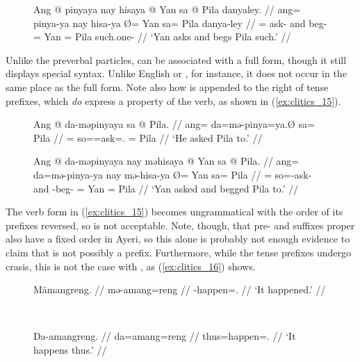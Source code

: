 \begin{figure}
\ex\label{ex:clitics_14}\begingl
	\gla Ang @ pinyaya nay hisaya {} @ Yan sa @ Pila danyaley. //
	\glb ang= pinya-ya nay hisa-ya Ø= Yan sa= Pila danya-ley //
	\glc \AgtT{}= ask-\TsgM{} and beg-\TsgM{} \Top{}= Yan \Parg{}= Pila
		such.one-\PargI{} //
	\glft `Yan asks and begs Pila such.' //
\endgl\xe
\end{figure}

Unlike the preverbal particles,  can be associated with a full
form, though it still displays special syntax. Unlike English
 or , for instance, it does not occur in the same place as
the full form. Note also how  is appended to the right of tense
prefixes, which \emph{do} express a property of the verb, as shown in 
(\ref{ex:clitics_15}).

\begin{figure}
\pex\label{ex:clitics_15}
\a\label{ex:clitics_15a}\begingl
	\gla Ang @ da-məpinyaya sa @ Pila. //
	\glb ang= da=mə-pinya=ya.Ø sa= Pila //
	\glc \AgtT{}= so=\Pst{}=ask=\TsgM{}.\Top{} \Parg{}= Pila //
	\glft `He asked Pila to.' //
\endgl

\a\label{ex:clitics_15b}\begingl
	\gla Ang @ da-məpinyaya nay məhisaya {} @ Yan sa @ Pila. //
	\glb ang= da=mə-pinya-ya nay mə-hisa-ya Ø= Yan sa= Pila //
	\glc \AgtT{}= so=\Pst{}-ask-\TsgM{} and \Pst{}-beg-\TsgM{} \Top{}= Yan 
		\Parg{}= Pila //
	\glft `Yan asked and begged Pila to.' //
\endgl
\xe
\end{figure}

The verb form in (\ref{ex:clitics_15}) becomes ungrammatical with the order of
its prefixes reversed, so  is not acceptable.
Note, though, that pre- and suffixes proper also have a fixed order in Ayeri,
so this alone is probably not enough evidence to claim that  is
not possibly a prefix. Furthermore, while the tense prefixes undergo crasis,
this is not the case with , as (\ref{ex:clitics_16}) shows.

\begin{figure}
\begin{minipage}[t]{.5\linewidth}
\pex\label{ex:clitics_17}
\a\label{ex:clitics_17a}\begingl
	\gla Māmangreng. //
	\glb mə-amang=reng //
	\glc \Pst{}-happen=\TsgI{}.\Aarg{} //
	\glft `It happened.' //
\endgl

\a\label{ex:clitics_17b}\ljudge{*} 
\xe
\end{minipage}
~
\begin{minipage}[t]{.5\linewidth}
\pex\label{ex:clitics_16}
\a\label{ex:clitics_16a}\begingl
	\gla Da-amangreng. //
	\glb da=amang=reng //
	\glc thus=happen=\TsgI{}.\Aarg{} //
	\glft `It happens thus.' //
\endgl

\a\label{ex:clitics_16b}\ljudge{*} 
\xe
\end{minipage}
\end{figure}

